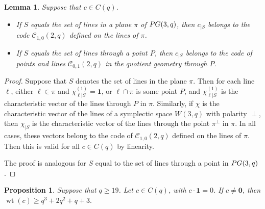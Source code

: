 \documentclass[a4paper]{article}
\newtheorem{lm}[thm]{Lemma}
\newtheorem{prop}[thm]{Proposition}
\theoremstyle{definition}
\newcommand{\pg}{\textnormal{PG}}
\newcommand{\one}{\mathbf 1}
\newcommand{\zero}{\mathbf 0}
\newcommand{\mc}{\mathcal C}
\DeclareMathOperator{\wt}{wt}
\begin{document}
\begin{lm}
 \label{Lm:Restriction}
 Suppose that $c \in C(q)$.
 \begin{itemize}
  \item If $S$ equals the set of lines in a plane $\pi$ of $\pg(3,q)$, then $c_{|S}$ belongs to the code $\mc_{1,0}(2,q)$ defined on the lines of $\pi$.
  \item If $S$ equals the set of lines through a point $P$, then $c_{|S}$ belongs to the code of points and lines $\mc_{0,1}(2,q)$ in the quotient geometry through $P$.
 \end{itemize}
\end{lm}

\begin{proof}
 Suppose that $S$ denotes the set of lines in the plane $\pi$.
 Then for each line $\ell$, either $\ell \in \pi$ and $\chi^{(1)}_{\ell|S} = \one$, or $\ell \cap \pi$ is some point $P$, and $\chi^{(1)}_{\ell|S}$ is the characteristic vector of the lines through $P$ in $\pi$.
 Similarly, if $\chi$ is the characteristic vector of the lines of a symplectic space $W(3,q)$ with polarity $\perp$, then $\chi_{|S}$ is the characteristic vector of the lines through the point $\pi^\perp$ in $\pi$.
 In all cases, these vectors belong to the code of $\mc_{1,0}(2,q)$ defined on the lines of $\pi$.
 Then this is valid for all $c \in C(q)$ by linearity.

 The proof is analogous for $S$ equal to  the set of lines through a point in $\pg(3,q)$.
\end{proof}

\begin{prop}
 \label{Prop:MinWtPerpToOne}
 Suppose that $q \geq 19$.
 Let $c\in C(q)$, with $c \cdot \one = 0$. If $c \neq \zero$, then $\wt(c)\geq 
 q^3 + 2q^2 + q + 3.$
\end{prop}
\end{document}
